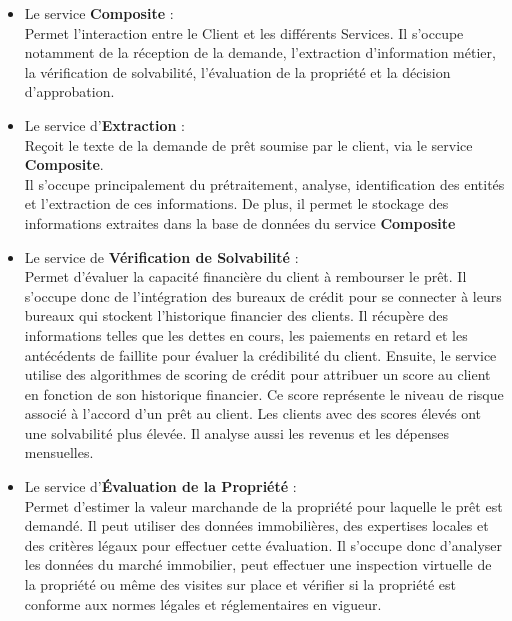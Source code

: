 \documentclass{article}
\begin{document}
		\begin{itemize}
			\item Le service \textbf{Composite} : \\
			
			Permet l’interaction entre le Client et les différents Services. Il s’occupe notamment de la réception de la demande, l’extraction d’information métier, la vérification de solvabilité, l’évaluation de la propriété et la décision d'approbation.
			
			\item Le service d’\textbf{Extraction} : \\
			
			Reçoit le texte de la demande de prêt soumise par le client, via le service \textbf{Composite}. \\
			Il s’occupe principalement du prétraitement, analyse, identification des entités et l’extraction de ces informations. De plus, il permet le stockage des informations extraites dans la base de données du service \textbf{Composite}
			
			\item Le service de \textbf{Vérification de Solvabilité} : \\
			
			Permet d'évaluer la capacité financière du client à rembourser le prêt. Il s’occupe donc de l’intégration des bureaux de crédit pour se connecter à leurs bureaux qui stockent l'historique financier des clients. Il récupère des informations telles que les dettes en cours, les paiements en retard et les antécédents de faillite pour évaluer la crédibilité du client. Ensuite, le service utilise des algorithmes de scoring de crédit pour attribuer un score au client en fonction de son historique financier. Ce score représente le niveau de risque associé à l'accord d'un prêt au client. Les clients avec des scores élevés ont une solvabilité plus élevée. Il analyse aussi les revenus et les dépenses mensuelles.
			
			\item Le service d'\textbf{Évaluation de la Propriété} :\\
			
			Permet d'estimer la valeur marchande de la propriété pour laquelle le prêt est demandé. Il peut utiliser des données immobilières, des expertises locales et des critères légaux pour effectuer cette évaluation. Il s’occupe donc d'analyser les données du marché immobilier, peut effectuer une inspection virtuelle de la propriété ou même des visites sur place et vérifier si la propriété est conforme aux normes légales et réglementaires en vigueur.
			

\end{itemize}
\end{document}
